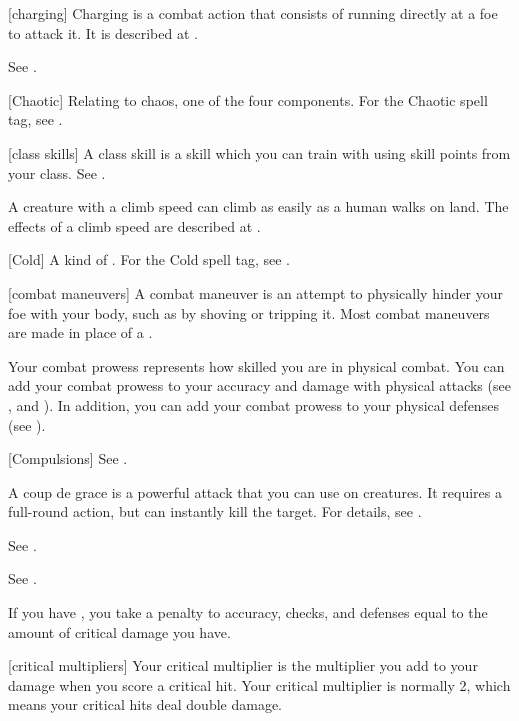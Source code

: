 [charging] Charging is a combat action that consists of running directly at a foe to attack it.
It is described at .

 See .

[Chaotic] Relating to chaos, one of the four  components. For the Chaotic spell tag, see .

[class skills] A class skill is a skill which you can train with using skill points from your class. See .

 A creature with a climb speed can climb as easily as a human walks on land.
The effects of a climb speed are described at .

[Cold] A kind of . For the Cold spell tag, see .

[combat maneuvers] A combat maneuver is an attempt to physically hinder your foe with your body, such as by shoving or tripping it.
Most combat maneuvers are made in place of a .

 Your combat prowess represents how skilled you are in physical combat.
You can add your combat prowess to your accuracy and damage with physical attacks (see , and ).
In addition, you can add your combat prowess to your physical defenses (see ).

[Compulsions] See .

 A coup de grace is a powerful attack that you can use on \helpless creatures.
It requires a full-round action, but can instantly kill the target.
For details, see .

 See .

 See .

 If you have , you take a penalty to accuracy, checks, and defenses equal to the amount of critical damage you have.

[critical multipliers] Your critical multiplier is the multiplier you add to your damage when you score a critical hit.
Your critical multiplier is normally 2, which means your critical hits deal double damage.


